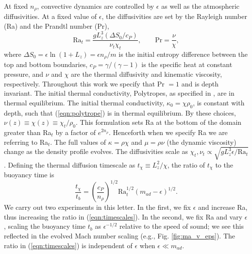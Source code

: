 \documentclass[aps, prl, twocolumn, nofootinbib, groupedaddress, amsfonts, amssymb, amsmath]{revtex4-1}
\begin{document}
At fixed $n_\rho$, convective dynamics are 
controlled by $\epsilon$ as well as the atmospheric diffusivities.
At a fixed value of
$\epsilon$, the diffusivities are set by the
Rayleigh number (Ra) and the Prandtl number (Pr),
\begin{equation}
\text{Ra}_{t} = \frac{g L_z^3 (\Delta S_0 / c_P)}{\nu_t\chi_t},
\qquad
\text{Pr} = \frac{\nu}{\chi},
\end{equation}
where $\Delta S_0 = \epsilon\ln (1 + L_z) = \epsilon n_\rho / m$ 
is the initial entropy
difference between the top and bottom boundaries,
$c_P = \gamma/(\gamma-1)$ is the specific heat at
constant pressure, and $\nu$ and $\chi$ are the thermal diffusivity and
kinematic viscosity, respectively.
Throughout this work we specify
that Pr $= 1$ and is depth invariant.
The initial thermal conductivity,
Polytropes, as specified in ,
are in thermal equilibrium. The initial thermal
conductivity, $\kappa_0 = \chi \rho_0$, is
constant with depth, such that (\ref{eqn:polytrope}) is in
thermal equilibrium. 
By these
choices, $\nu(z) \equiv \chi(z) \equiv \chi_t / \rho_0$.
This formulation 
sets Ra at the bottom of the domain greater than
Ra$_t$ by a factor of $e^{2n_\rho}$. Henceforth
when we specify Ra we are referring to Ra$_t$.  
The full values of $\kappa = \rho\chi$ and 
$\mu = \rho\nu$ (the dynamic viscosity) change as the density 
profile evolves.  
The diffusivities scale as
$\chi_t, \nu_t \propto \sqrt{g L_z^3 \epsilon / \text{Ra}_t}$.
Defining the thermal diffusion timescale as $t_\chi \equiv L_z^2 / \chi$, the
ratio of $t_\chi$ to the buoyancy time is
\begin{equation}
\frac{t_\chi}{t_b} = \left(\frac{c_P}{n_\rho}\right)^{1/2}\text{Ra}_t^{1/2}
\left(m_{ad} - \epsilon\right)^{1/2}.
\label{eqn:timescales}
\end{equation}
We carry out two experiments in this letter. In the first,
we fix $\epsilon$ and increase Ra, thus increasing the ratio in
(\ref{eqn:timescales}). In the second, we fix Ra and vary $\epsilon$,
scaling the buoyancy time $t_b$ as $\epsilon^{-1/2}$
relative to the speed of sound; we see this reflected in the evolved Mach
number scaling (e.g., Fig. \ref{fig:ma_v_eps}). The ratio in (\ref{eqn:timescales}) is
independent of $\epsilon$ when $\epsilon \ll m_{ad}$.
\end{document}
